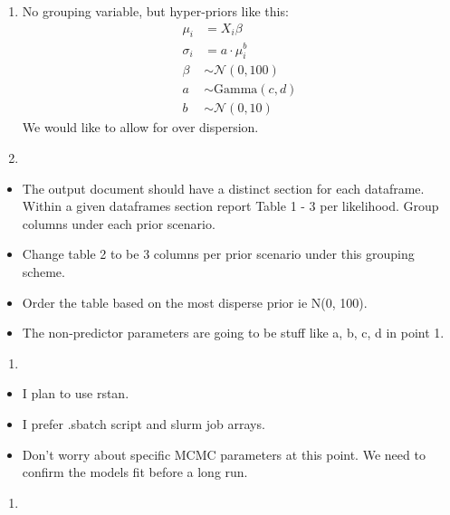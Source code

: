\documentclass[
  letterpaper,
]{article}
\providecommand{\tightlist}{%
  \setlength{\itemsep}{0pt}\setlength{\parskip}{0pt}}
\begin{document}
\begin{enumerate}
\def\labelenumi{\arabic{enumi}.}
\item
  No grouping variable, but hyper-priors like this:\\
  \begin{equation*}
  \begin{aligned} 
   \mu_i &= X_i \beta \\ 
   \sigma_i &= a \cdot \mu_i^b \\
   \beta &\sim \mathcal{N}(0, 100) \\
   a &\sim \text{Gamma}(c, d) \\ 
   b &\sim \mathcal{N}(0, 10)
  \end{aligned}
  \end{equation*} We would like to allow for over dispersion.
\item
\end{enumerate}

\begin{itemize}
\item
  The output document should have a distinct section for each dataframe.
  Within a given dataframes section report Table 1 - 3 per likelihood.
  Group columns under each prior scenario.
\item
  Change table 2 to be 3 columns per prior scenario under this grouping
  scheme.
\item
  Order the table based on the most disperse prior ie N(0, 100).
\item
  The non-predictor parameters are going to be stuff like a, b, c, d in
  point 1.
\end{itemize}

\begin{enumerate}
\def\labelenumi{\arabic{enumi}.}
\setcounter{enumi}{2}
\tightlist
\item
\end{enumerate}

\begin{itemize}
\tightlist
\item
  I plan to use rstan.\\
\item
  I prefer .sbatch script and slurm job arrays.
\item
  Don't worry about specific MCMC parameters at this point. We need to
  confirm the models fit before a long run.
\end{itemize}

\begin{enumerate}
\def\labelenumi{\arabic{enumi}.}
\setcounter{enumi}{3}
\tightlist
\item
\end{enumerate}
\end{document}
